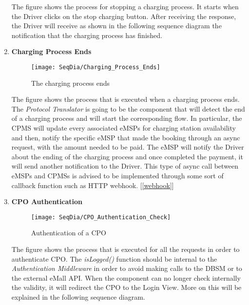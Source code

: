 \begin{enumerate}
\begin{figure}[H]
        \end{figure}
        The figure shows the process for stopping a charging process. It starts when the Driver clicks on the stop charging button. After receiving the response, the Driver will receive as shown in the following sequence diagram the notification that the charging process has finished.
        \newpage
        \item \textbf{Charging Process Ends}
        \begin{figure}[H]
            \begin{center}
            \texttt{[image: SeqDia/Charging\_Process\_Ends]}
            \caption{The charging process ends}
            \label{fig:EndCharge}
            \end{center}
        \end{figure}
        The figure shows the process that is executed when a charging process ends. The \textit{Protocol Translator} is going to be the component that will detect the end of a charging process and will start the corresponding flow. In particular, the CPMS will update every associated eMSPs for charging station availability and then, notify the specific eMSP that made the booking through an async request, with the amount needed to be paid. The eMSP will notify the Driver about the ending of the charging process and once completed the payment, it will send another notification to the Driver. This type of async call between eMSPs and CPMSs is advised to be implemented through some sort of callback function such as HTTP webhook. [\ref{webhook}]
        \newpage
        \item \textbf{CPO Authentication}
        \begin{figure}[H]
            \begin{center}
            \texttt{[image: SeqDia/CPO\_Authentication\_Check]}
            \caption{Authentication of a CPO}
            \label{fig:CPOAuthentication}
            \end{center}
        \end{figure}
        The figure shows the process that is executed for all the requests in order to authenticate CPO. The \textit{isLogged()} function should be internal to the \textit{Authentication Middleware} in order to avoid making calls to the DBSM or to the external eMall API. When the component can no longer check internally the validity, it will redirect the CPO to the Login View. More on this will be explained in the following sequence diagram.

\end{enumerate}
